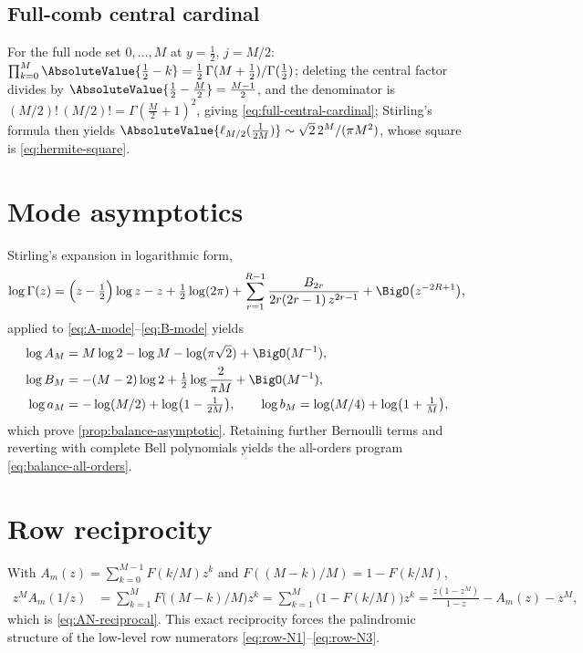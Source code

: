 \subsection{Full-comb central cardinal}
For the full node set $0,\dots,M$ at $y=\tfrac12$, $j=M/2$:
$\prod_{k=0}^{M}\AbsoluteValue{\tfrac12-k}
=\tfrac12\,\Gamma(M+\tfrac12)/\Gamma(\tfrac12)$; deleting the
central factor divides by $\AbsoluteValue{\tfrac12-\tfrac M2}=\tfrac{M-1}2$,
and the denominator is
$(M/2)!\,(M/2)!=\Gamma(\tfrac M2+1)^{2}$, giving
\eqref{eq:full-central-cardinal}; Stirling's formula then yields
$\AbsoluteValue{\ell_{M/2}(\tfrac1{2M})}\sim\sqrt2\,2^{M}/(\pi M^{2})$, whose
square is \eqref{eq:hermite-square}.

\section{Mode asymptotics}
\label{app:mode-asymptotics}

Stirling's expansion in logarithmic form,
\begin{equation}
 \log\Gamma(z)
 =\Bigl(z-\tfrac12\Bigr)\log z-z+\tfrac12\log(2\pi)
 +\sum_{r=1}^{R-1}\frac{B_{2r}}{2r(2r-1)\,z^{2r-1}}
 +\BigO\bigl(z^{-2R+1}\bigr),
 \label{eq:stirling}
\end{equation}
applied to \eqref{eq:A-mode}--\eqref{eq:B-mode} yields
\begin{align}
 \log A_M&=M\log2-\log M-\log(\pi\sqrt2)+\BigO(M^{-1}),\\
 \log B_M&=-(M-2)\log2+\tfrac12\log\frac{2}{\pi M}+\BigO(M^{-1}),\\
 \log a_M&=-\log(M/2)+\log\bigl(1-\tfrac1{2M}\bigr),
 \qquad
 \log b_M=\log(M/4)+\log\bigl(1+\tfrac1M\bigr),
\end{align}
which prove \cref{prop:balance-asymptotic}.  Retaining further
Bernoulli terms and reverting with complete Bell polynomials yields
the all-orders program \eqref{eq:balance-all-orders}.

\section{Row reciprocity}
\label{app:row-symmetry}

With $A_m(z)=\sum_{k=0}^{M-1}F(k/M)z^{k}$ and
$F((M-k)/M)=1-F(k/M)$,
\begin{align}
 z^{M}A_m(1/z)
 &=\sum_{k=1}^{M}F\bigl((M-k)/M\bigr)z^{k}
 =\sum_{k=1}^{M}\bigl(1-F(k/M)\bigr)z^{k}
 =\frac{z(1-z^{M})}{1-z}-A_m(z)-z^{M},
\end{align}
which is \eqref{eq:AN-reciprocal}.  This exact reciprocity forces the
palindromic structure of the low-level row numerators
\eqref{eq:row-N1}--\eqref{eq:row-N3}.

